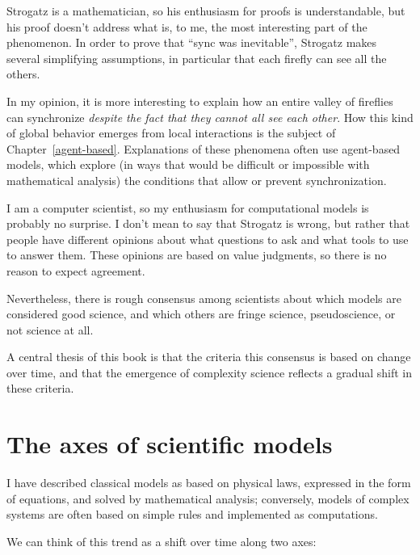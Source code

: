 \documentclass[12pt]{book}
\theoremstyle{exercise}
\begin{document}
Strogatz is a mathematician, so his enthusiasm for proofs is
understandable, but his proof doesn't address what is, to me, the most
interesting part of the phenomenon.  In order to prove that ``sync was
inevitable'', Strogatz makes several simplifying assumptions, in
particular that each firefly can see all the others.


In my opinion, it is more interesting to explain how an entire valley
of fireflies can synchronize {\em despite the fact that they cannot
  all see each other}.  How this kind of global behavior emerges from
local interactions is the subject of Chapter~\ref{agent-based}.
Explanations of these phenomena often use agent-based models, which
explore (in ways that would be difficult or impossible with
mathematical analysis) the conditions that allow or prevent
synchronization.

I am a computer scientist, so my enthusiasm for computational models
is probably no surprise.  I don't mean to say that Strogatz is wrong,
but rather that people have different opinions about what questions to
ask and what tools to use to answer them.  These opinions are based
on value judgments, so there is no reason to expect agreement.


Nevertheless, there is rough consensus among scientists
about which models are considered good science, and which others
are fringe science, pseudoscience, or not science at all.


A central thesis of this book is that the
criteria this consensus is based on change over time, and that
the emergence of complexity science reflects a gradual shift in
these criteria.


\section{The axes of scientific models}

I have described classical models as based on physical laws, expressed
in the form of equations, and solved by mathematical analysis;
conversely, models of complex systems are often based on simple
rules and implemented as computations.


We can think of this trend as a shift over time along two axes:
\end{document}

